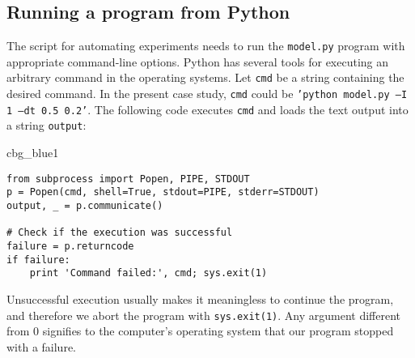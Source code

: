 \documentclass[graybox,sectrefs,envcountresetchap,open=right,final]{svmonodo}
\newenvironment{_cod_tight}[1]{
   \def\FrameCommand{\colorbox{#1}}
   \FrameRule0.6pt\MakeFramed {\FrameRestore}\vskip3mm}
   {\vskip0mm\endMakeFramed}
\newenvironment{cod}[1]{
\bgroup\rmfamily
\fboxsep=0mm\relax
\begin{_cod_tight}{#1}
\list{}{\parsep=-2mm\parskip=0mm\topsep=0pt\leftmargin=2mm
\rightmargin=2\leftmargin\leftmargin=4pt\relax}
\item\relax}
{\endlist\end{_cod_tight}\egroup}
\begin{document}
\subsection{Running a program from Python}

The script for automating experiments needs to run the \texttt{model.py} program
with appropriate command-line options. Python has several tools for
executing an arbitrary command in the operating systems.
Let \texttt{cmd} be a string containing the desired command.
In the present case study, \texttt{cmd} could be \texttt{'python model.py --I 1 --dt 0.5 0.2'}.
The following code
executes \texttt{cmd} and loads the text output into a string \texttt{output}:

\begin{cod}{cbg_blue1}\begin{Verbatim}[numbers=none,fontsize=\fontsize{9pt}{9pt},baselinestretch=0.95,xleftmargin=2mm]
from subprocess import Popen, PIPE, STDOUT
p = Popen(cmd, shell=True, stdout=PIPE, stderr=STDOUT)
output, _ = p.communicate()

# Check if the execution was successful
failure = p.returncode
if failure:
    print 'Command failed:', cmd; sys.exit(1)
\end{Verbatim}
\end{cod}
\noindent
Unsuccessful execution usually makes it meaningless to continue
the program, and therefore we abort the program with \texttt{sys.exit(1)}.
Any argument different from 0 signifies to the computer's operating system
that our program stopped with a failure.
\end{document}

